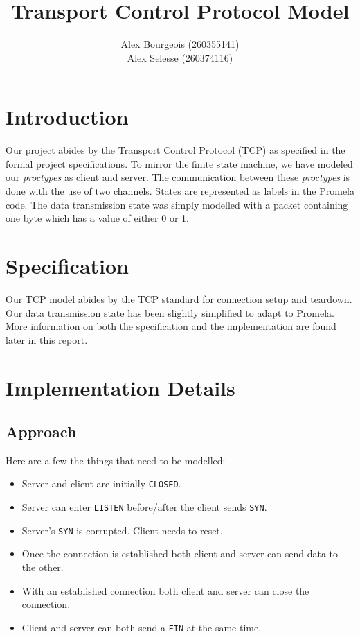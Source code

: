 \documentclass{WigReport}
\title{Transport Control Protocol Model}
\author{Alex Bourgeois (260355141) \\
 Alex Selesse (260374116)}
\begin{document}
\MakeTitlePage
\tableofcontents
\clearpage

\section{Introduction}

Our project abides by the Transport Control Protocol (TCP) as specified in the
formal project specifications. To mirror the finite state machine, we have
modeled our \textit{proctypes} as client and server.
The communication between these \textit{proctypes} is done with the
use of two channels. States are represented as labels in the Promela code.
The data transmission state was simply modelled with a packet containing one
byte which has a value of either 0 or 1.

\section{Specification}

Our TCP model abides by the TCP standard for connection setup and teardown. Our
data transmission state has been slightly simplified to adapt to Promela.
More information on both the specification and the implementation are found
later in this report.

\section{Implementation Details}

\subsection{Approach}

Here are a few the things that need to be modelled:
\begin{itemize}
\item Server and client are initially \verb|CLOSED|.
\item Server can enter \verb|LISTEN| before/after the client sends \verb|SYN|.
\item Server's \verb|SYN| is corrupted. Client needs to reset.
\item Once the connection is established both client and server can send data to the other.
\item With an established connection both client and server can close the connection.
\item Client and server can both send a \verb|FIN| at the same time.
\end{itemize}
\end{document}
